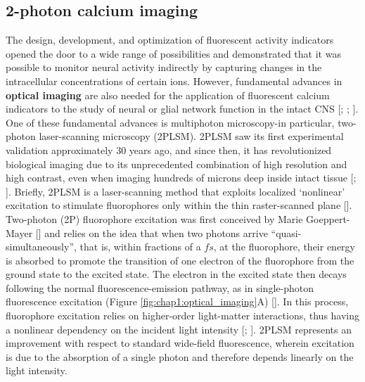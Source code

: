 \subsection{2-photon calcium imaging}
\label{chap1:sec:1:subsec4:2_photon_imaging}

The design, development, and optimization of fluorescent activity indicators opened the door to a wide range of possibilities and demonstrated that it was possible to monitor neural activity indirectly by capturing changes in the intracellular concentrations of certain ions. 
However, fundamental advances in \textbf{optical imaging} are also needed for the application of fluorescent calcium indicators to the study of neural or glial network function in the intact CNS [\cite{grienberger2012}; \cite{bovetti2014}; \cite{yang2017}].
One of these fundamental advances is multiphoton microscopy-in particular, two-photon laser-scanning microscopy (2PLSM).
2PLSM saw its first experimental validation approximately 30 years ago, and since then, it has revolutionized biological imaging due to its unprecedented combination of high resolution and high contrast, even when imaging hundreds of microns deep inside intact tissue [\cite{denk1994}; \cite{helmchen2005}].
Briefly, 2PLSM is a laser-scanning method that exploits localized ‘nonlinear’ excitation to stimulate fluorophores only within the thin raster-scanned plane [\cite{zipfel2003}]. 
Two-photon (2P) fluorophore excitation was first conceived by Marie Goeppert-Mayer [\cite{goppertmayer1931}] and relies on the idea that when two photons arrive \enquote{quasi-simultaneously}, that is, within fractions of a $fs$, at the fluorophore, their energy is absorbed to promote the transition of one electron of the fluorophore from the ground state to the excited state.
The electron in the excited state then decays following the normal fluorescence-emission pathway, as in single-photon fluorescence excitation (Figure \ref{fig:chap1:optical_imaging}A) [\cite{pawley2006}].
In this process, fluorophore excitation relies on higher-order light-matter interactions, thus having a nonlinear dependency on the incident light intensity [\cite{svoboda2006}; \cite{helmchen2005}]. 
2PLSM represents an improvement with respect to standard wide-field fluorescence, wherein excitation is due to the absorption of a single photon and therefore depends linearly on the light intensity. 
